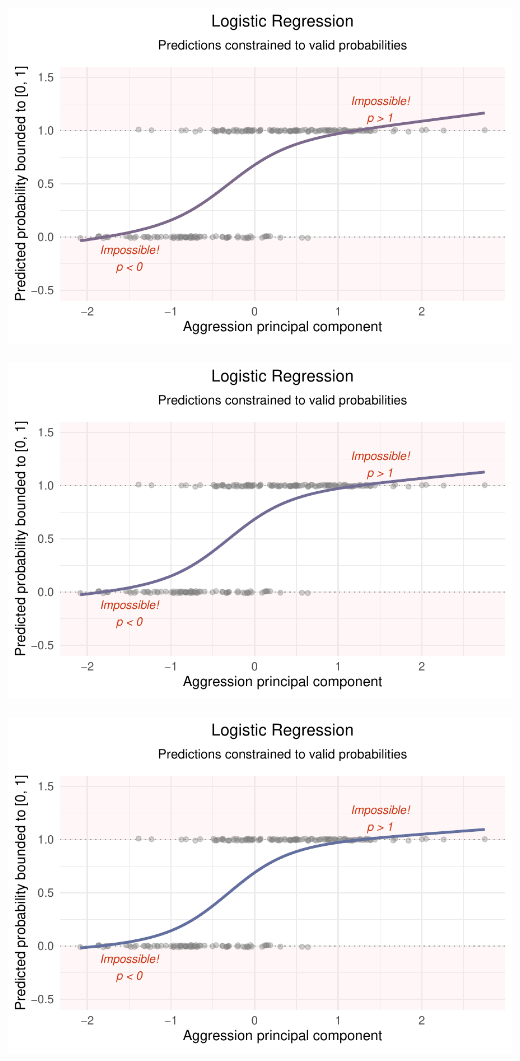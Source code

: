 \documentclass[
  letterpaper,
  DIV=11,
  numbers=noendperiod]{scrartcl}
\begin{document}
\begin{center}
\includegraphics[width=0.8\linewidth,height=\textheight,keepaspectratio]{Beyond!!!_files/figure-pdf/unnamed-chunk-4-39.pdf}
\end{center}

\begin{center}
\includegraphics[width=0.8\linewidth,height=\textheight,keepaspectratio]{Beyond!!!_files/figure-pdf/unnamed-chunk-4-40.pdf}
\end{center}

\begin{center}
\includegraphics[width=0.8\linewidth,height=\textheight,keepaspectratio]{Beyond!!!_files/figure-pdf/unnamed-chunk-4-41.pdf}
\end{center}
\end{document}
